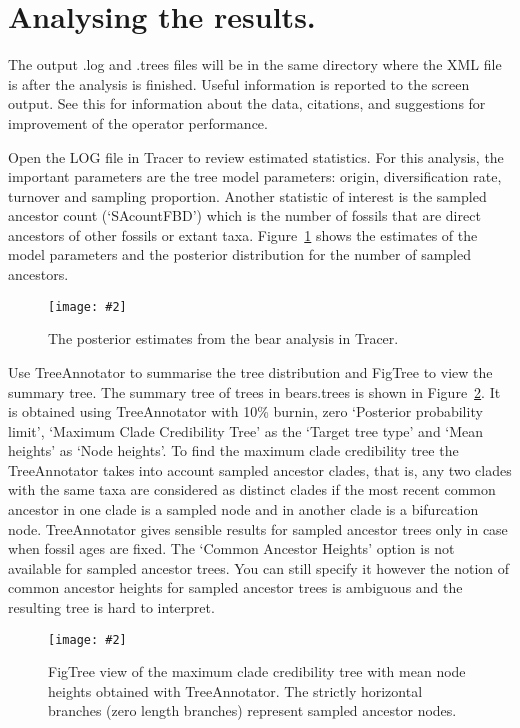 \documentclass[12pt]{article}
\newcommand{\includeimage}[2][]{%
\texttt{[image: \#2]}
}
\begin{document}
\section{Analysing the results.} 

The output .log and .trees files will be in the same directory where the XML file is after the analysis is finished. Useful information is reported to the screen output. See this for information about the data, citations, and suggestions for improvement of the operator performance.  

Open the LOG file in Tracer to review estimated statistics. For this analysis, the important parameters are the tree model parameters: origin, diversification rate, turnover and sampling proportion. Another statistic of interest is the sampled ancestor count (`SAcountFBD') which is the number of fossils that are direct ancestors of other fossils or extant taxa. Figure~\ref{fig:TracerOutput} shows the estimates of the model parameters and the posterior distribution for the number of sampled ancestors. 

\begin{figure}	
\centering
\includeimage[width=\textwidth]{figures/TracerOutput}
\caption{The posterior estimates from the bear analysis in Tracer. \label{fig:TracerOutput}}
\end{figure}

Use TreeAnnotator to summarise the tree distribution and FigTree to view the summary tree. The summary tree of trees in bears.trees is shown in Figure~\ref{fig:FigTree}. It is obtained using TreeAnnotator with 10\% burnin, zero `Posterior probability limit', `Maximum Clade Credibility Tree' as the `Target tree type' and `Mean heights' as `Node heights'. To find the maximum clade credibility tree the TreeAnnotator takes into account sampled ancestor clades, that is, any two clades with the same taxa are considered as distinct clades if the most recent common ancestor in one clade is a sampled node and in another clade is a bifurcation node. TreeAnnotator gives sensible results for sampled ancestor trees only in case when fossil ages are fixed.  The `Common Ancestor Heights' option is not available for sampled ancestor trees. You can still specify it however the notion of common ancestor heights for sampled ancestor trees is ambiguous and the resulting tree is hard to interpret. 

\begin{figure}	
\centering
\includeimage[width=\textwidth]{figures/FigTree}
\caption{FigTree view of the maximum clade credibility tree with mean node heights obtained with TreeAnnotator. The strictly horizontal branches (zero length branches) represent sampled ancestor nodes. \label{fig:FigTree}}
\end{figure}



\end{document}
